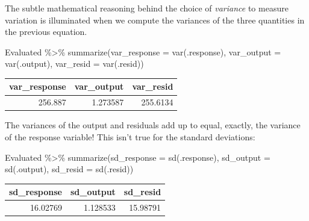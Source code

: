 \documentclass[
  letterpaper,
  DIV=11,
  numbers=noendperiod,
  oneside]{scrreprt}
\newenvironment{Shaded}{\begin{snugshade}}{\end{snugshade}}
\newcommand{\AttributeTok}[1]{\textcolor[rgb]{0.40,0.45,0.13}{#1}}
\newcommand{\FunctionTok}[1]{\textcolor[rgb]{0.28,0.35,0.67}{#1}}
\newcommand{\NormalTok}[1]{\textcolor[rgb]{0.00,0.23,0.31}{#1}}
\newcommand{\SpecialCharTok}[1]{\textcolor[rgb]{0.37,0.37,0.37}{#1}}
\begin{document}
\begin{tcolorbox}[enhanced jigsaw, colbacktitle=quarto-callout-warning-color!10!white, breakable, opacitybacktitle=0.6, colback=white, left=2mm, arc=.35mm, colframe=quarto-callout-warning-color-frame, coltitle=black, toprule=.15mm, opacityback=0, leftrule=.75mm, bottomtitle=1mm, toptitle=1mm, titlerule=0mm, title=\textcolor{quarto-callout-warning-color}{\faExclamationTriangle}\hspace{0.5em}{Demonstration: Why the variance?}, rightrule=.15mm, bottomrule=.15mm]

The subtle mathematical reasoning behind the choice of \emph{variance}
to measure variation is illuminated when we compute the variances of the
three quantities in the previous equation.

\begin{Shaded}
\begin{Highlighting}[]
\NormalTok{Evaluated }\SpecialCharTok{\%\textgreater{}\%}
  \FunctionTok{summarize}\NormalTok{(}\AttributeTok{var\_response =} \FunctionTok{var}\NormalTok{(.response),}
            \AttributeTok{var\_output =} \FunctionTok{var}\NormalTok{(.output),}
            \AttributeTok{var\_resid  =} \FunctionTok{var}\NormalTok{(.resid))}
\end{Highlighting}
\end{Shaded}

\ttfamily 
\begin{tabular}{rrr}
\toprule
var\_response & var\_output & var\_resid\\
\midrule
256.887 & 1.273587 & 255.6134\\
\bottomrule
\end{tabular} \normalfont
\bigskip

The variances of the output and residuals add up to equal, exactly, the
variance of the response variable! This isn't true for the standard
deviations:

\begin{Shaded}
\begin{Highlighting}[]
\NormalTok{Evaluated }\SpecialCharTok{\%\textgreater{}\%}
  \FunctionTok{summarize}\NormalTok{(}\AttributeTok{sd\_response =} \FunctionTok{sd}\NormalTok{(.response),}
            \AttributeTok{sd\_output =} \FunctionTok{sd}\NormalTok{(.output),}
            \AttributeTok{sd\_resid  =} \FunctionTok{sd}\NormalTok{(.resid))}
\end{Highlighting}
\end{Shaded}

\ttfamily 
\begin{tabular}{rrr}
\toprule
sd\_response & sd\_output & sd\_resid\\
\midrule
16.02769 & 1.128533 & 15.98791\\
\bottomrule
\end{tabular} \normalfont
\bigskip

\end{tcolorbox}
\end{document}
